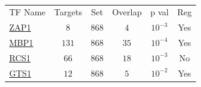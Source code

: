 \begin{table}[h!]
\centering 
{}
\begin{tabular}{l c c c c c}
\hline

TF Name &	Targets &	Set &	Overlap &	p val &	Reg \\ 
\href{www.yeastgenome.org/cgi-bin/locus.fpl?locus=ZAP1}{ZAP1} &	 $8$ &	$868$&	$4$ &	$10^{-3}$ & 	 Yes \\ 
\href{www.yeastgenome.org/cgi-bin/locus.fpl?locus=MBP1}{MBP1} &	 $131$ &	$868$&	$35$ &	$10^{-4}$ & 	 Yes \\ 
\href{www.yeastgenome.org/cgi-bin/locus.fpl?locus=RCS1}{RCS1} &	 $66$ &	$868$&	$18$ &	$10^{-3}$ & 	 No \\ 
\href{www.yeastgenome.org/cgi-bin/locus.fpl?locus=GTS1}{GTS1} &	 $12$ &	$868$&	$5$ &	$10^{-2}$ & 	 Yes \\ 
\hline
\end{tabular} 
\caption[]{}
\label{}
\end{table} 


